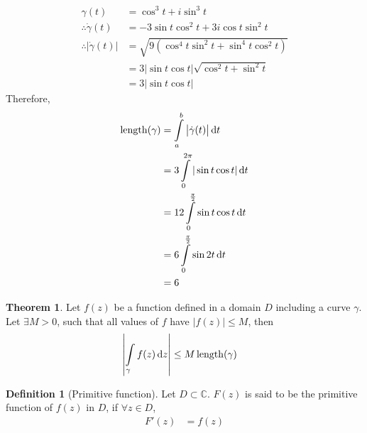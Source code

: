 \documentclass[titlepage, fleqn, a4paper, 12pt, twoside]{article}
\theoremstyle{definition}
\newtheorem{definition}{Definition}
\theoremstyle{theorem}
\newtheorem{theorem}{Theorem}
\DeclareMathOperator{\length}{length}
\begin{document}
\begin{solution}
	\begin{align*}
		\gamma(t)                                 & = \cos^3 t + i \sin^3 t                                         \\
		\therefore \dot{\gamma}(t)                & = -3 \sin t \cos^2 t + 3 i \cos t \sin^2 t                      \\
		\therefore \left| \dot{\gamma}(t) \right| & = \sqrt{9 \left( \cos^4 t \sin^2 t + \sin^4 t \cos^2 t \right)} \\
                                                          & = 3 |\sin t \cos t| \sqrt{\cos^2 t + \sin^2 t}                  \\
                                                          & = 3 |\sin t \cos t|
	\end{align*}
	Therefore,
	\begin{align*}
		\length(\gamma) & = \int\limits_{a}^{b} \left| \dot{\gamma}(t) \right| \dif t \\
                                & = 3 \int\limits_{0}^{2 \pi} |\sin t \cos t| \dif t          \\
                                & = 12 \int\limits_{0}^{\frac{\pi}{2}} \sin t \cos t \dif t   \\
                                & = 6 \int\limits_{0}^{\frac{\pi}{2}} \sin 2 t \dif t         \\
                                & = 6
	\end{align*}
\end{solution}

\begin{theorem}
	Let $f(z)$ be a function defined in a domain $D$ including a curve $\gamma$.
	Let $\exists M > 0$, such that all values of $f$ have $\left| f(z) \right| \le M$, then
	\begin{align*}
		\left| \int\limits_{\gamma} f(z) \dif z \right| & \le M \length(\gamma)
	\end{align*}
\end{theorem}

\begin{definition}[Primitive function]
	Let $D \subset \mathbb{C}$.
	$F(z)$ is said to be the primitive function of $f(z)$ in $D$, if $\forall z \in D$,
	\begin{align*}
		F'(z) & = f(z)
	\end{align*}
\end{definition}
\end{document}
